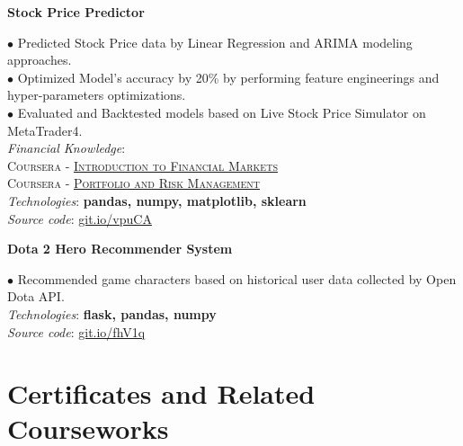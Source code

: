 \documentclass[10pt]{article}
\begin{document}
        \begin{center}
            \textbf{Stock Price Predictor}
        \end{center}
        $\bullet$ {Predicted Stock Price data by Linear Regression and ARIMA modeling approaches.} \\
        $\bullet$ {Optimized Model's accuracy by 20\% by performing feature engineerings and hyper-parameters optimizations.} \\
        $\bullet$ {Evaluated and Backtested models based on Live Stock Price Simulator on MetaTrader4.} \\
        \emph{Financial Knowledge}: \\
            \hspace*{5mm} \textsc{Coursera - \href{https://www.coursera.org/account/accomplishments/certificate/K8F27A8BM58Q?utm_medium=certificate&utm_source=link&utm_campaign=copybutton_certificate}{Introduction to Financial Markets}} \\
            \hspace*{5mm} \textsc{Coursera - \href{https://www.coursera.org/account/accomplishments/certificate/34BTLCR3KZNR?utm_medium=certificate&utm_source=link&utm_campaign=copybutton_certificate}{Portfolio and Risk Management}} \\
        \emph{Technologies}: \textbf{pandas, numpy, matplotlib, sklearn} \\
        \emph{Source code}: \href{https://git.io/vpuCA}{git.io/vpuCA}


        \begin{center}
            \textbf{Dota 2 Hero Recommender System}
        \end{center}
        $\bullet$ {Recommended game characters based on historical user data collected by Open Dota API.} \\
        \emph{Technologies}: \textbf{flask, pandas, numpy} \\
        \emph{Source code}: \href{https://git.io/fhV1q}{git.io/fhV1q}


    \section{Certificates and Related Courseworks}
\end{document}
